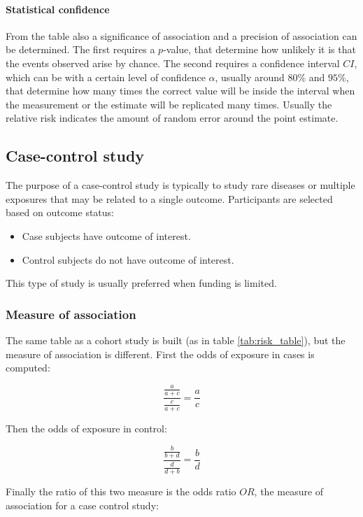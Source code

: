			\paragraph{Statistical confidence}
			From the table also a significance of association and a precision of association can be determined.
			The first requires a $p$-value, that determine how unlikely it is that the events observed arise by chance.
			The second requires a confidence interval $CI$, which can be with a certain level of confidence $\alpha$, usually around $80\%$ and $95\%$, that determine how many times the correct value will be inside the interval when the measurement or the estimate will be replicated many times.
			Usually the relative risk indicates the amount of random error around the point estimate.

	\subsection{Case-control study}
	The purpose of a case-control study is typically to study rare diseases or multiple exposures that may be related to a single outcome.
	Participants are selected based on outcome status:

	\begin{multicols}{2}
		\begin{itemize}
			\item Case subjects have outcome of interest.
			\item Control subjects do not have outcome of interest.
		\end{itemize}
	\end{multicols}

	This type of study is usually preferred when funding is limited.

		\subsubsection{Measure of association}
		The same table as a cohort study is built (as in table \ref{tab:risk_table}), but the measure of association is different.
		First the odds of exposure in cases is computed:

		$$\frac{\frac{a}{a+c}}{\frac{c}{a+c}} = \frac{a}{c}$$

		Then the odds of exposure in control:

		$$\frac{\frac{b}{b+d}}{\frac{d}{d+b}} = \frac{b}{d}$$

		Finally the ratio of this two measure is the odds ratio $OR$, the measure of association for a case control study:

